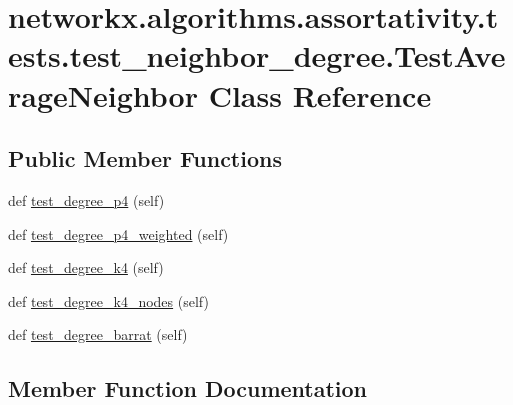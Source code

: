 \hypertarget{classnetworkx_1_1algorithms_1_1assortativity_1_1tests_1_1test__neighbor__degree_1_1TestAverageNeighbor}{}\section{networkx.\+algorithms.\+assortativity.\+tests.\+test\+\_\+neighbor\+\_\+degree.\+Test\+Average\+Neighbor Class Reference}
\label{classnetworkx_1_1algorithms_1_1assortativity_1_1tests_1_1test__neighbor__degree_1_1TestAverageNeighbor}
\subsection*{Public Member Functions}
\begin{DoxyCompactItemize}
\item 
def \hyperlink{classnetworkx_1_1algorithms_1_1assortativity_1_1tests_1_1test__neighbor__degree_1_1TestAverageNeighbor_a64c471d0019b6938325234eeb1cae6a0}{test\+\_\+degree\+\_\+p4} (self)
\item 
def \hyperlink{classnetworkx_1_1algorithms_1_1assortativity_1_1tests_1_1test__neighbor__degree_1_1TestAverageNeighbor_adf6da92fb9cd5ad65467316d714ec1ad}{test\+\_\+degree\+\_\+p4\+\_\+weighted} (self)
\item 
def \hyperlink{classnetworkx_1_1algorithms_1_1assortativity_1_1tests_1_1test__neighbor__degree_1_1TestAverageNeighbor_a791393f4012de07c6857544950a80b25}{test\+\_\+degree\+\_\+k4} (self)
\item 
def \hyperlink{classnetworkx_1_1algorithms_1_1assortativity_1_1tests_1_1test__neighbor__degree_1_1TestAverageNeighbor_ac6179701587b4436085b043284af43c6}{test\+\_\+degree\+\_\+k4\+\_\+nodes} (self)
\item 
def \hyperlink{classnetworkx_1_1algorithms_1_1assortativity_1_1tests_1_1test__neighbor__degree_1_1TestAverageNeighbor_ad735815c78d85331c6c0b94d17a356b5}{test\+\_\+degree\+\_\+barrat} (self)
\end{DoxyCompactItemize}


\subsection{Member Function Documentation}
\mbox{\label{classnetworkx_1_1algorithms_1_1assortativity_1_1tests_1_1test__neighbor__degree_1_1TestAverageNeighbor_ad735815c78d85331c6c0b94d17a356b5}} 

